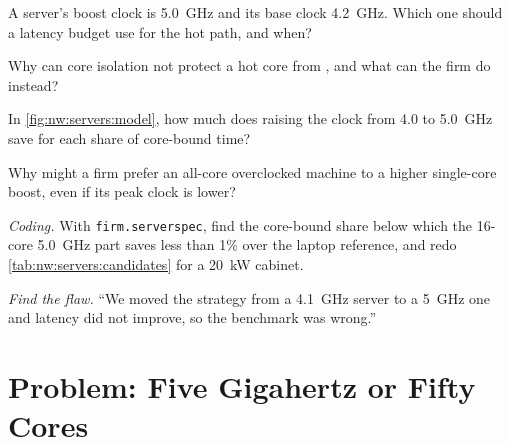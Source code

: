 \begin{exercise}[$\star$]\label{exo:nw:servers:3}
A server's boost clock is 5.0~GHz and its base clock 4.2~GHz. Which one should a latency budget use for the hot path, and when?
\end{exercise}

\begin{exercise}[$\star\star$]\label{exo:nw:servers:4}
Why can core isolation not protect a hot core from , and what can the firm do instead?
\end{exercise}

\begin{exercise}[$\star\star$]\label{exo:nw:servers:5}
In \cref{fig:nw:servers:model}, how much does raising the clock from 4.0 to 5.0~GHz save for each share of core-bound time?
\end{exercise}

\begin{exercise}[$\star\star$]\label{exo:nw:servers:6}
Why might a firm prefer an all-core overclocked machine to a higher single-core boost, even if its peak clock is lower?
\end{exercise}

\begin{exercise}[$\star\star\star$]\label{exo:nw:servers:7}
\emph{Coding.} With \texttt{firm.serverspec}, find the core-bound share below which the 16-core 5.0~GHz part saves less than 1\% over the
laptop reference, and redo \cref{tab:nw:servers:candidates} for a \qty{20}{\kilo\watt} cabinet.
\end{exercise}

\begin{exercise}[$\star\star\star$]\label{exo:nw:servers:8}
\emph{Find the flaw.} ``We moved the strategy from a 4.1~GHz server to a 5~GHz one and latency did not improve, so the benchmark was wrong.''
\end{exercise}

\section{Problem: Five Gigahertz or Fifty Cores}


